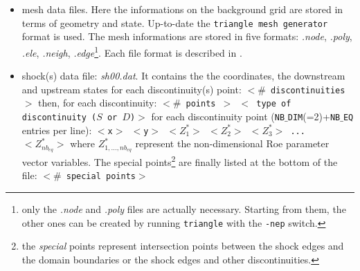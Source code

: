 \documentclass[11pt,a4paper,oneside]{article}
\begin{document}
\begin{itemize}
\item{mesh data files. Here the informations on the background grid are stored in terms of geometry and state. Up-to-date the \texttt{triangle mesh generator} format is used. The mesh informations are stored in five formats: \textit{.node}, \textit{.poly}, \textit{.ele}, \textit{.neigh}, \textit{.edge}\footnote{only the \textit{.node} and \textit{.poly} files are actually necessary. Starting from them, the other ones can be created by running \texttt{triangle} with the \texttt{-nep} switch.}. Each file format is described in \cite{triangle}.}
\item{shock(s) data file: \textit{sh00.dat}. It contains the the coordinates, the downstream and upstream states for each discontinuity(s) point:
\newline
\newline 
\texttt{$<$$\#$ discontinuities$>$}
\newline
\newline
\hspace*{0.2cm} then, for each discontinuity:
\newline
\newline
\hspace*{0.2cm} \texttt{$<$$\#$ points $>$ $<$ type of discontinuity ($S$ or $D$)$>$}
\newline
\newline
\hspace*{0.4cm} for each discontinuity point (\texttt{NB$\_$DIM}(=2)+\texttt{NB$\_$EQ} entries per line):
\newline
\newline
\hspace*{0.4cm} \texttt{$<$x$>$ $<$y$>$ $<Z^{*}_1>$ $<Z^{*}_2>$ $<Z^{*}_3>$ ... $<Z^{*}_{nb_{eq}}>$}
\newline
\newline
\hspace*{0.4cm} where $Z^{*}_{1,...,nb_{eq}}$ represent the non-dimensional Roe parameter vector variables.
\newline
\newline
The special points\footnote{the \textit{special} points represent intersection points between the shock edges and the domain boundaries or the shock edges and other discontinuities.} are finally listed at the bottom of the file:
\newline
\newline 
\texttt{$<$$\#$ special points$>$}
\newline
}
\end{itemize}
\end{document}
